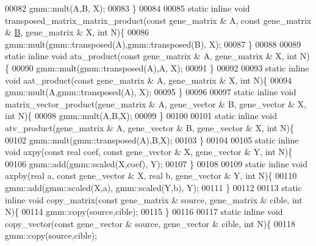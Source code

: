 \begin{DoxyCode}
00082     gmm::mult(A,B, X);
00083   \}
00084 
00085   \textcolor{keyword}{static} \textcolor{keyword}{inline} \textcolor{keywordtype}{void} transposed\_matrix\_matrix\_product(\textcolor{keyword}{const} gene\_matrix & A, \textcolor{keyword}{const} gene\_matrix & 
      \hyperlink{group___core___module_class_eigen_1_1_matrix}{B}, gene\_matrix & X, \textcolor{keywordtype}{int} N)\{
00086     gmm::mult(gmm::transposed(A),gmm::transposed(B), X);
00087   \}
00088 
00089   \textcolor{keyword}{static} \textcolor{keyword}{inline} \textcolor{keywordtype}{void} ata\_product(\textcolor{keyword}{const} gene\_matrix & A, gene\_matrix & X, \textcolor{keywordtype}{int} N)\{
00090     gmm::mult(gmm::transposed(A),A, X);
00091   \}
00092 
00093   \textcolor{keyword}{static} \textcolor{keyword}{inline} \textcolor{keywordtype}{void} aat\_product(\textcolor{keyword}{const} gene\_matrix & A, gene\_matrix & X, \textcolor{keywordtype}{int} N)\{
00094     gmm::mult(A,gmm::transposed(A), X);
00095   \}
00096 
00097   \textcolor{keyword}{static} \textcolor{keyword}{inline} \textcolor{keywordtype}{void} matrix\_vector\_product(gene\_matrix & A, gene\_vector & B, gene\_vector & X, \textcolor{keywordtype}{int} N)\{
00098     gmm::mult(A,B,X);
00099   \}
00100 
00101   \textcolor{keyword}{static} \textcolor{keyword}{inline} \textcolor{keywordtype}{void} atv\_product(gene\_matrix & A, gene\_vector & B, gene\_vector & X, \textcolor{keywordtype}{int} N)\{
00102     gmm::mult(gmm::transposed(A),B,X);
00103   \}
00104 
00105   \textcolor{keyword}{static} \textcolor{keyword}{inline} \textcolor{keywordtype}{void} axpy(\textcolor{keyword}{const} real coef, \textcolor{keyword}{const} gene\_vector & X, gene\_vector & Y, \textcolor{keywordtype}{int} N)\{
00106     gmm::add(gmm::scaled(X,coef), Y);
00107   \}
00108 
00109   \textcolor{keyword}{static} \textcolor{keyword}{inline} \textcolor{keywordtype}{void} axpby(real a, \textcolor{keyword}{const} gene\_vector & X, real b, gene\_vector & Y, \textcolor{keywordtype}{int} N)\{
00110     gmm::add(gmm::scaled(X,a), gmm::scaled(Y,b), Y);
00111   \}
00112 
00113   \textcolor{keyword}{static} \textcolor{keyword}{inline} \textcolor{keywordtype}{void} copy\_matrix(\textcolor{keyword}{const} gene\_matrix & source, gene\_matrix & cible, \textcolor{keywordtype}{int} N)\{
00114     gmm::copy(source,cible);
00115   \}
00116 
00117   \textcolor{keyword}{static} \textcolor{keyword}{inline} \textcolor{keywordtype}{void} copy\_vector(\textcolor{keyword}{const} gene\_vector & source, gene\_vector & cible, \textcolor{keywordtype}{int} N)\{
00118     gmm::copy(source,cible);

\end{DoxyCode}
